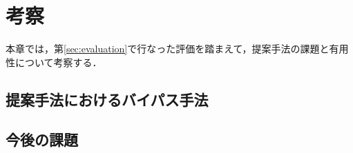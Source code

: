 \section{考察}
本章では，第\ref{sec:evaluation}で行なった評価を踏まえて，提案手法の課題と有用性について考察する．

\subsection{提案手法におけるバイパス手法}
\subsection{今後の課題}

